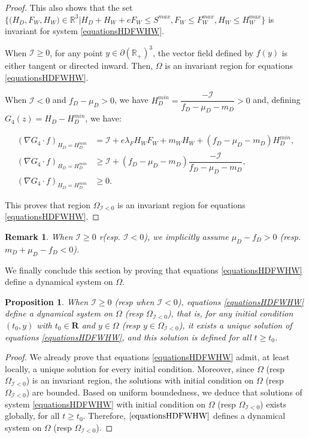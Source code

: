 \documentclass{article}
\newcommand{\lfw}{\lambda_{F}}
\newcommand{\lfw}{\lambda_{F}}
\newcommand{\cI}{\mathcal{I}}
\newtheorem{prop}{Proposition}
\newtheorem{remark}{Remark}
\begin{document}
\begin{proof}
This also shows that the set  $\Big\{\Big(H_D, F_W, H_W \Big) \in \mathbb{R}^3  \Big|H_D + H_W + eF_W \leq S^{max}, F_W \leq F_W^{max}, H_W \leq H_W^{max} \Big\}$ is invariant for system \eqref{equationsHDFWHW}. 


When $\cI \geq 0$, for any point $y \in \partial (\mathbb{R}_+)^3$, the vector field defined by $f(y)$ is either tangent or directed inward. Then, $\Omega$ is an invariant region for equations \eqref{equationsHDFWHW}. 


When $\cI < 0$ and $f_D - \mu_D > 0$, we have $H_D^{min} = \dfrac{-\cI}{f_D - \mu_D - m_D} > 0$ and, defining $G_4(z) = H_D - H_D^{min}$, we have:

\begin{align*}
(\nabla G_4 \cdot f)_{H_D = H_D^{min}} &= \cI + e\lfw H_W F_W + m_W H_W + (f_D - \mu_D - m_D) H_D^{min}, \\
(\nabla G_4 \cdot f)_{H_D = H_D^{min}} &\geq \cI + (f_D - \mu_D - m_D)\dfrac{-\cI}{f_D - \mu_D - m_D}, \\
(\nabla G_4 \cdot f)_{H_D = H_D^{min}} &\geq 0.
\end{align*}

This proves that region $\Omega_{\cI < 0}$ is an invariant region for equations \eqref{equationsHDFWHW}. 
\end{proof}

\begin{remark}
When $\cI \geq 0$ r(esp. $\cI < 0$), we implicitly assume $\mu_D - f_D > 0$ (resp. $m_D + \mu_D - f_D < 0$).
\end{remark}

We finally conclude this section by proving that equations \eqref{equationsHDFWHW} define a dynamical system on $\Omega$.

\begin{prop}
When $\cI \geq 0$ (resp when $\cI < 0$), equations \eqref{equationsHDFWHW} define a dynamical system on $\Omega$ (resp $\Omega_{\cI < 0}$), that is, for any initial condition $(t_0, y)$ with $t_0 \in \mathbf{R}$ and $y \in \Omega$ (resp $y \in \Omega_{\cI < 0}$),  it exists a unique solution of equations \eqref{equationsHDFWHW}, and this solution is defined for all $t \geq t_0$.
\end{prop}

\begin{proof}
We already prove that equations \eqref{equationsHDFWHW} admit, at least locally, a unique solution for every initial condition. Moreover, since $\Omega$ (resp $\Omega_{\cI <0}$) is an invariant region, the solutions with initial condition on $\Omega$ (resp $\Omega_{\cI <0}$) are bounded. Based on uniform boundedness, we deduce that solutions of system \eqref{equationsHDFWHW} with initial condition on $\Omega$ (resp $\Omega_{\cI <0}$) exists globally, for all $t\geq t_0$. Therefore, $\eqref{equationsHDFWHW}$ defines a dynamical system on $\Omega$ (resp $\Omega_{\cI <0}$).
\end{proof}
\end{document}
